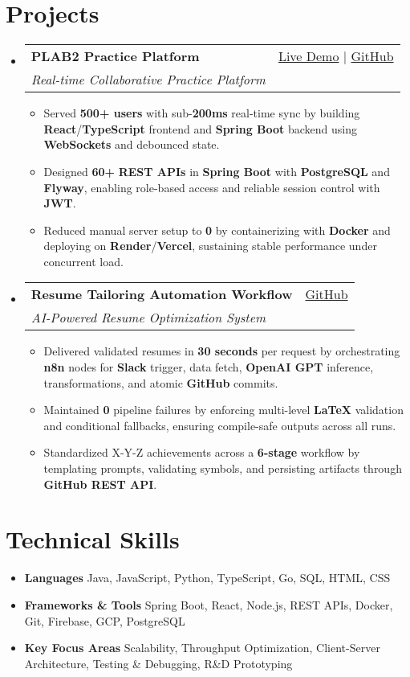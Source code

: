 \documentclass[letterpaper,11pt]{article}
\makeatletter
\newcommand{\resumeItem}[1]{\item\small{#1 \vspace{-2pt}}}
\newcommand{\resumeSubheading}[4]{
  \vspace{-1pt}\item
    \begin{tabular*}{0.97\textwidth}[t]{l@{\extracolsep{\fill}}r}
      \textbf{#1} & #2 \\
      \textit{\small#3} & \textit{\small #4} \\
    \end{tabular*}\vspace{-5pt}
}
\newcommand{\resumeSubHeadingListStart}{\begin{itemize}[leftmargin=*]}
\newcommand{\resumeSubHeadingListEnd}{\end{itemize}}
\newcommand{\resumeItemListStart}{\begin{itemize}}
\newcommand{\resumeItemListEnd}{\end{itemize}\vspace{-5pt}}
\makeatother
\begin{document}
\section{Projects}
  \resumeSubHeadingListStart
    \resumeSubheading
      {\textbf{PLAB2 Practice Platform}}{\href{https://plab2practice.com}{Live Demo} | \href{https://github.com/altansaid/plab2projectnew}{GitHub}}
      {Real-time Collaborative Practice Platform}{}
      \resumeItemListStart
        \resumeItem{Served \textbf{500+ users} with sub-\textbf{200ms} real-time sync by building \textbf{React}/\textbf{TypeScript} frontend and \textbf{Spring Boot} backend using \textbf{WebSockets} and debounced state.}
        \resumeItem{Designed \textbf{60+} \textbf{REST APIs} in \textbf{Spring Boot} with \textbf{PostgreSQL} and \textbf{Flyway}, enabling role-based access and reliable session control with \textbf{JWT}.}
        \resumeItem{Reduced manual server setup to \textbf{0} by containerizing with \textbf{Docker} and deploying on \textbf{Render}/\textbf{Vercel}, sustaining stable performance under concurrent load.}
      \resumeItemListEnd

    \resumeSubheading
      {\textbf{Resume Tailoring Automation Workflow}}{\href{https://github.com/altansaid/resume-automation-workflow}{GitHub}}
      {AI-Powered Resume Optimization System}{}
      \resumeItemListStart
    \resumeItem{Delivered validated resumes in \textbf{30 seconds} per request by orchestrating \textbf{n8n} nodes for \textbf{Slack} trigger, data fetch, \textbf{OpenAI GPT} inference, transformations, and atomic \textbf{GitHub} commits.}
    \resumeItem{Maintained \textbf{0} pipeline failures by enforcing multi-level \textbf{LaTeX} validation and conditional fallbacks, ensuring compile-safe outputs across all runs.}
    \resumeItem{Standardized X-Y-Z achievements across a \textbf{6-stage} workflow by templating prompts, validating symbols, and persisting artifacts through \textbf{GitHub REST API}.}



      \resumeItemListEnd
  \resumeSubHeadingListEnd

\section{Technical Skills}
  \resumeItemListStart
    \resumeItem{\textbf{Languages}}{Java, JavaScript, Python, TypeScript, Go, SQL, HTML, CSS}
    \resumeItem{\textbf{Frameworks \& Tools}}{Spring Boot, React, Node.js, REST APIs, Docker, Git, Firebase, GCP, PostgreSQL}
    \resumeItem{\textbf{Key Focus Areas}}{Scalability, Throughput Optimization, Client-Server Architecture, Testing \& Debugging, R\&D Prototyping}
  \resumeItemListEnd
\end{document}
